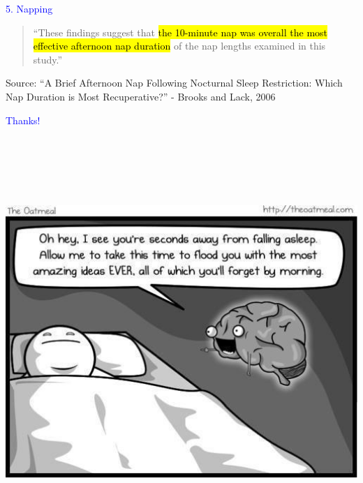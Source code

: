 \documentclass[landscape]{slides}
\begin{document}
\begin{slide}

    \textcolor{blue}{\Large{5. Napping}}

    \begin{quote}
        ``These findings suggest that \hl{the 10-minute nap was overall the most effective afternoon nap duration} of the nap lengths examined in this study.''
    \end{quote}

    \small{Source: ``A Brief Afternoon Nap Following Nocturnal Sleep Restriction: Which Nap Duration is Most Recuperative?'' - Brooks and Lack, 2006}

\end{slide}


\begin{slide}

    \textcolor{blue}{\Large{Thanks!}}

    \begin{center}
        \includegraphics[height=15.5cm]{oatmeal-sleep-brain}
    \end{center}

\end{slide}
\end{document}
